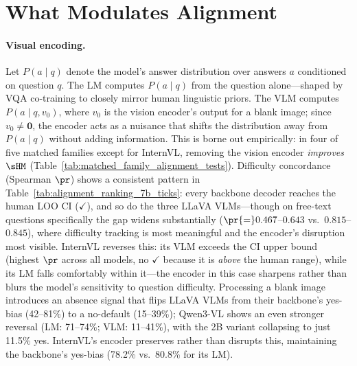 \section{What Modulates Alignment}
\label{sec:ablation}


\paragraph{Visual encoding.}
Let $P(a\mid q)$ denote the model's answer distribution over answers $a$ conditioned on question $q$.
The LM computes $P(a\mid q)$ from the question alone---shaped by VQA co-training to closely mirror human linguistic priors. The VLM computes $P(a\mid q,v_0)$, where $v_0$ is the vision encoder's output for a blank image; since $v_0\!\neq\!\mathbf{0}$, the encoder acts as a nuisance that shifts the distribution away from $P(a\mid q)$ without adding information.
This is borne out empirically: in four of five matched families except for InternVL, removing the vision encoder \emph{improves} $\sHM$ (Table~\ref{tab:matched_family_alignment_tests}).
Difficulty concordance (Spearman $\pr$) shows a consistent pattern in Table~\ref{tab:alignment_ranking_7b_ticks}: every backbone decoder reaches the human LOO CI ($\checkmark$), and so do the three LLaVA VLMs---though on free-text questions specifically the gap widens substantially ($\pr{=}0.467$--$0.643$ vs.\ $0.815$--$0.845$), where difficulty tracking is most meaningful and the encoder's disruption most visible.
InternVL reverses this: its VLM exceeds the CI upper bound (highest $\pr$ across all models, no $\checkmark$ because it is \emph{above} the human range), while its LM falls comfortably within it---the encoder in this case sharpens rather than blurs the model's sensitivity to question difficulty. %
Processing a blank image introduces an absence signal that flips LLaVA VLMs from their backbone's yes-bias (42--81\%) to a no-default (15--39\%); Qwen3-VL shows an even stronger reversal (LM: 71--74\%; VLM: 11--41\%), with the 2B variant collapsing to just 11.5\% yes. %
InternVL's encoder preserves rather than disrupts this, maintaining the backbone's yes-bias (78.2\% vs.\ 80.8\% for its LM).


